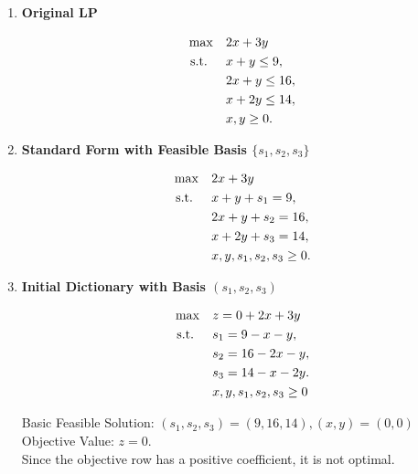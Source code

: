 \begin{enumerate}
    \item \textbf{Original LP}  
    \begin{tcolorbox}[colback=orange!5!white, colframe=orange!75!black,    
    width=0.6\textwidth, %
    box align=center, 
    title=\textbf{Linear Program to Solve}]
    \[
    \begin{aligned}
    \max \quad & 2x + 3y \\
    \text{ s.t. } \quad 
    & x + y \leq 9, \\
    & 2x + y \leq 16, \\
    & x + 2y \leq 14, \\
    & x, y \geq 0.
    \end{aligned}
    \]
    \end{tcolorbox}

    \item \textbf{Standard Form with Feasible Basis $\{s_1, s_2, s_3\}$}  
    \begin{tcolorbox}[colback=gray!5!white, colframe=gray!75!black,    
    width=0.6\textwidth, %
    box align=center, 
    title=\textbf{Standard Form}]
    \[
    \begin{aligned}
    \max \quad & 2x + 3y \\
    \text{ s.t. } \quad 
    & x + y + s_1 = 9, \\
    & 2x + y + s_2 = 16, \\
    & x + 2y + s_3 = 14, \\
    & x, y, s_1, s_2, s_3 \geq 0.
    \end{aligned}
    \]
    \end{tcolorbox}

    \item \textbf{Initial Dictionary with Basis \( (s_1, s_2, s_3) \)}
    \begin{tcolorbox}[colback=blue!5!white, colframe=blue!75!black,    
    width=0.6\textwidth, %
    box align=center, 
    title=\textbf{Initial Dictionary}]
    \[
    \begin{aligned}
    \max \quad & z = 0 + 2x + 3y \\
    \text{ s.t. } \quad 
    & s_1 = 9 - x - y, \\
    & s_2 = 16 - 2x - y, \\
    & s_3 = 14 - x - 2y.\\
    & x,y,s_1, s_2, s_3 \geq 0
    \end{aligned}
    \]
    \end{tcolorbox}
    Basic Feasible Solution: \( (s_1, s_2, s_3) = (9,16,14), (x,y) = (0,0) \)  
    Objective Value: \( z = 0 \).\\  
    Since the objective row has a positive coefficient, it is not optimal.
    

\end{enumerate}
